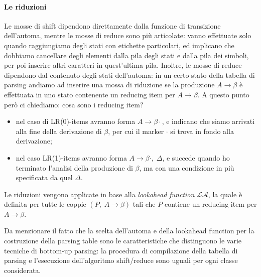 \documentclass[class=book, crop=false, oneside, 12pt]{standalone}
\begin{document}
\paragraph{Le riduzioni}
Le mosse di shift dipendono direttamente dalla funzione di transizione dell'automa, mentre le mosse di reduce sono più articolate: vanno effettuate solo quando raggiungiamo degli stati con etichette particolari, ed implicano che dobbiamo cancellare degli elementi dalla pila degli stati e dalla pila dei simboli, per poi inserire altri caratteri in quest'ultima pila. Inoltre, le mosse di reduce dipendono dal contenuto degli stati dell'automa: in un certo stato della tabella di parsing andiamo ad inserire una mossa di riduzione se la produzione \(A \to \beta\) è effettuata in uno stato contenente un reducing item per \(A \to \beta\). A questo punto però ci chiediamo: cosa sono i reducing item?
\begin{itemize}
    \item nel caso di LR(0)-items avranno forma \(A \to \beta \cdot\), e indicano che siamo arrivati alla fine della derivazione di \(\beta\), per cui il marker \(\cdot\) si trova in fondo alla derivazione;
    \item nel caso LR(1)-items avranno forma \(A \to \beta \cdot, \; \Delta\), e succede quando ho terminato l'analisi della produzione di \(\beta\),  ma con una condizione in più specificata da quel \(\Delta\).
\end{itemize}
Le riduzioni vengono applicate in base alla \emph{lookahead function} \(\mathcal{LA}\), la quale è definita per tutte le coppie \((P,\; A \to \beta)\) tali che \(P\) contiene un reducing item per \(A \to \beta\).

Da menzionare il fatto che la scelta dell'automa e della lookahead function per la costruzione della parsing table sono le caratteristiche che distinguono le varie tecniche di bottom-up parsing: la procedura di compilazione della tabella di parsing e l'esecuzione dell'algoritmo shift/reduce sono uguali per ogni classe considerata.
\end{document}
